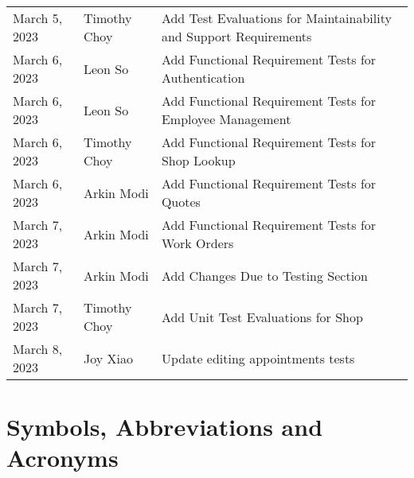 \documentclass[12pt, titlepage]{article}
\begin{document}
\begin{table}[hp]
\begin{tabularx}{\textwidth}{llX}
		March 5, 2023     & Timothy Choy          & Add Test Evaluations for Maintainability and Support Requirements \\
		March 6, 2023     & Leon So               & Add Functional Requirement Tests for Authentication               \\
		March 6, 2023     & Leon So               & Add Functional Requirement Tests for Employee Management          \\
		March 6, 2023     & Timothy Choy          & Add Functional Requirement Tests for Shop Lookup                  \\
		March 6, 2023     & Arkin Modi            & Add Functional Requirement Tests for Quotes                       \\
		March 7, 2023     & Arkin Modi            & Add Functional Requirement Tests for Work Orders                  \\
		March 7, 2023     & Arkin Modi            & Add Changes Due to Testing Section                                \\
		March 7, 2023     & Timothy Choy          & Add Unit Test Evaluations for Shop                                \\
		March 8, 2023     & Joy Xiao              & Update editing appointments tests                                 \\
		\bottomrule
	\end{tabularx}
\end{table}
\newpage

\section{Symbols, Abbreviations and Acronyms}
\end{document}
